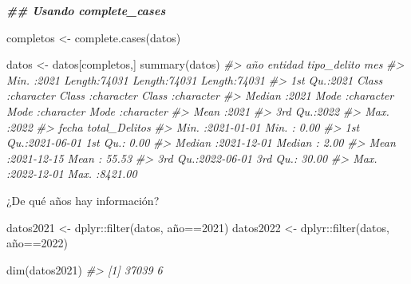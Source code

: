 \documentclass[
]{book}
\newenvironment{Shaded}{\begin{snugshade}}{\end{snugshade}}
\newcommand{\CommentTok}[1]{\textcolor[rgb]{0.56,0.35,0.01}{\textit{#1}}}
\newcommand{\DecValTok}[1]{\textcolor[rgb]{0.00,0.00,0.81}{#1}}
\newcommand{\DocumentationTok}[1]{\textcolor[rgb]{0.56,0.35,0.01}{\textbf{\textit{#1}}}}
\newcommand{\FunctionTok}[1]{\textcolor[rgb]{0.00,0.00,0.00}{#1}}
\newcommand{\NormalTok}[1]{#1}
\newcommand{\OtherTok}[1]{\textcolor[rgb]{0.56,0.35,0.01}{#1}}
\newcommand{\SpecialCharTok}[1]{\textcolor[rgb]{0.00,0.00,0.00}{#1}}
\begin{document}
\begin{Shaded}
\begin{Highlighting}[]
\DocumentationTok{\#\# Usando complete\_cases}

\NormalTok{completos }\OtherTok{\textless{}{-}} \FunctionTok{complete.cases}\NormalTok{(datos)}

\NormalTok{datos }\OtherTok{\textless{}{-}}\NormalTok{ datos[completos,] }
\FunctionTok{summary}\NormalTok{(datos)}
\CommentTok{\#\textgreater{}       año         entidad          tipo\_delito            mes           }
\CommentTok{\#\textgreater{}  Min.   :2021   Length:74031       Length:74031       Length:74031      }
\CommentTok{\#\textgreater{}  1st Qu.:2021   Class :character   Class :character   Class :character  }
\CommentTok{\#\textgreater{}  Median :2021   Mode  :character   Mode  :character   Mode  :character  }
\CommentTok{\#\textgreater{}  Mean   :2021                                                           }
\CommentTok{\#\textgreater{}  3rd Qu.:2022                                                           }
\CommentTok{\#\textgreater{}  Max.   :2022                                                           }
\CommentTok{\#\textgreater{}      fecha            total\_Delitos    }
\CommentTok{\#\textgreater{}  Min.   :2021{-}01{-}01   Min.   :   0.00  }
\CommentTok{\#\textgreater{}  1st Qu.:2021{-}06{-}01   1st Qu.:   0.00  }
\CommentTok{\#\textgreater{}  Median :2021{-}12{-}01   Median :   2.00  }
\CommentTok{\#\textgreater{}  Mean   :2021{-}12{-}15   Mean   :  55.53  }
\CommentTok{\#\textgreater{}  3rd Qu.:2022{-}06{-}01   3rd Qu.:  30.00  }
\CommentTok{\#\textgreater{}  Max.   :2022{-}12{-}01   Max.   :8421.00}
\end{Highlighting}
\end{Shaded}

¿De qué años hay información?

\begin{Shaded}
\begin{Highlighting}[]

\NormalTok{datos2021 }\OtherTok{\textless{}{-}}\NormalTok{ dplyr}\SpecialCharTok{::}\FunctionTok{filter}\NormalTok{(datos, año}\SpecialCharTok{==}\DecValTok{2021}\NormalTok{)}
\NormalTok{datos2022 }\OtherTok{\textless{}{-}}\NormalTok{ dplyr}\SpecialCharTok{::}\FunctionTok{filter}\NormalTok{(datos, año}\SpecialCharTok{==}\DecValTok{2022}\NormalTok{)}
\end{Highlighting}
\end{Shaded}

\begin{Shaded}
\begin{Highlighting}[]
\FunctionTok{dim}\NormalTok{(datos2021)}
\CommentTok{\#\textgreater{} [1] 37039     6}
\end{Highlighting}
\end{Shaded}
\end{document}
